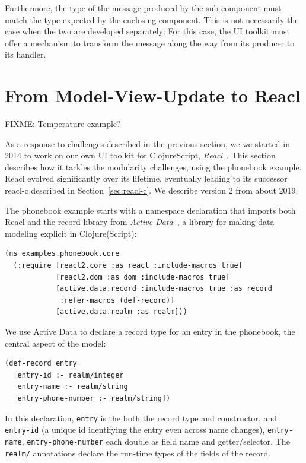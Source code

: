 \documentclass[sigplan,screen]{acmart}
\begin{document}
Furthermore, the type of the message produced by the sub-component
must match the type expected by the enclosing component.  This is not
necessarily the case when the two are developed separately: For this
case, the UI toolkit must offer a mechanism to transform the message
along the way from its producer to its handler.

\section{From Model-View-Update to Reacl}
\label{sec:reacl}

FIXME: Temperature example?

As a response to challenges described in the previous section, we we
started in 2014 to work on our own UI toolkit for ClojureScript,
\textit{Reacl}~\cite{Reacl}.  This section describes how it tackles
the modularity challenges, using the phonebook example.  Reacl evolved
significantly over its lifetime, eventually leading to its successor
reacl-c described in Section~\ref{sec:reacl-c}.  We describe version 2
from about 2019.

The phonebook example starts with a namespace declaration that imports
both Reacl and the record library from \textit{Active
  Data}~\cite{ActiveData}, a library for making data modeling
explicit in Clojure(Script):
%
\begin{verbatim}
(ns examples.phonebook.core
  (:require [reacl2.core :as reacl :include-macros true]
            [reacl2.dom :as dom :include-macros true]
            [active.data.record :include-macros true :as record
             :refer-macros (def-record)]
            [active.data.realm :as realm]))
\end{verbatim}
%
We use Active Data to declare a record type for an entry in the
phonebook, the central aspect of the model:
%
\begin{verbatim}
(def-record entry
  [entry-id :- realm/integer
   entry-name :- realm/string
   entry-phone-number :- realm/string])
\end{verbatim}
%
In this declaration, \texttt{entry} is the both the record type and
constructor, and \texttt{entry-id} (a unique id identifying the entry
even across name changes), \texttt{entry-name},
\texttt{entry-phone-number} each double as field name and
getter/selector.  The \texttt{realm/} annotations declare the run-time
types of the fields of the record.
\end{document}
